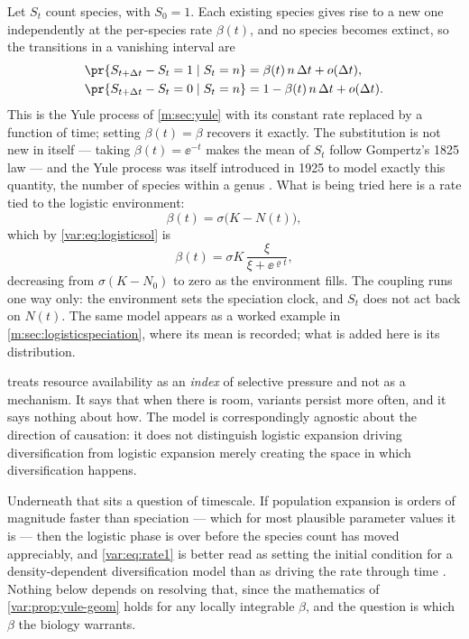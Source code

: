 Let $S_t$ count species, with $S_0=1$. Each existing species gives rise to a
new one independently at the per-species rate $\beta(t)$, and no species
becomes extinct, so the transitions in a vanishing interval are
\begin{align}
\pr{S_{t+\Delta t}-S_t=1\mid S_t=n}&=\beta(t)\,n\,\Delta t+o(\Delta t),
\label{var:eq:transitions}\\
\pr{S_{t+\Delta t}-S_t=0\mid S_t=n}&=1-\beta(t)\,n\,\Delta t+o(\Delta t).
\notag
\end{align}
This is the Yule process of \cref{m:sec:yule} with its constant rate replaced
by a function of time; setting $\beta(t)=\beta$ recovers it exactly. The
substitution is not new in itself --- taking $\beta(t)=\ee^{-t}$ makes the
mean of $S_t$ follow Gompertz's 1825 law \cite{gompertz1825xxiv} --- and the
Yule process was itself introduced in 1925 to model exactly this quantity,
the number of species within a genus \cite{Yule1925}. What is being tried
here is a rate tied to the logistic environment:
\begin{equation}
\beta(t)=\sigma\bigl(K-N(t)\bigr),
\label{var:eq:rate1}
\end{equation}
which by \cref{var:eq:logisticsol} is
\begin{equation}
\beta(t)=\sigma K\,\frac{\xi}{\xi+\ee^{\varrho t}},
\label{var:eq:ratesolved}
\end{equation}
decreasing from $\sigma(K-N_0)$ to zero as the environment fills. The
coupling runs one way only: the environment sets the speciation clock, and
$S_t$ does not act back on $N(t)$. The same model appears as a worked example
in \cref{m:sec:logisticspeciation}, where its mean is recorded; what is added
here is its distribution.

\begin{remark}
\label{var:rem:scope}
 treats resource availability as an \emph{index} of
selective pressure and not as a mechanism. It says that when there is room,
variants persist more often, and it says nothing about how. The model is
correspondingly agnostic about the direction of causation: it does not
distinguish logistic expansion driving diversification from logistic
expansion merely creating the space in which diversification happens.

Underneath that sits a question of timescale. If population expansion is
orders of magnitude faster than speciation --- which for most plausible
parameter values it is --- then the logistic phase is over before the species
count has moved appreciably, and \cref{var:eq:rate1} is better read as
setting the initial condition for a density-dependent diversification model
than as driving the rate through time \cite{morlon2014phylogenetic}. Nothing
below depends on resolving that, since the mathematics of
\cref{var:prop:yule-geom} holds for any locally integrable $\beta$, and the
question is which $\beta$ the biology warrants.
\end{remark}

